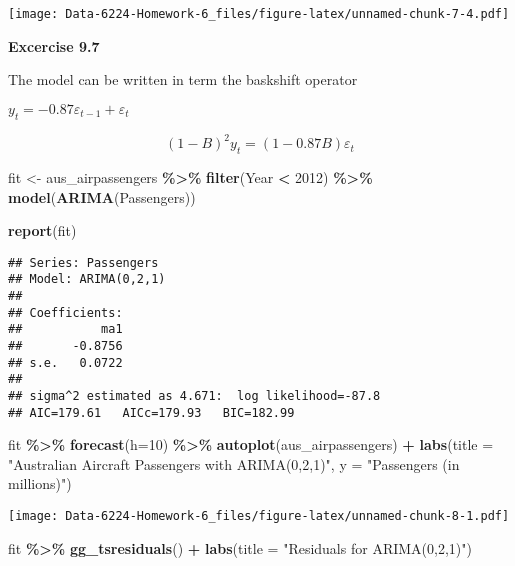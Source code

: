 \documentclass[
]{article}
\newenvironment{Shaded}{\begin{snugshade}}{\end{snugshade}}
\newcommand{\AttributeTok}[1]{\textcolor[rgb]{0.13,0.29,0.53}{#1}}
\newcommand{\DecValTok}[1]{\textcolor[rgb]{0.00,0.00,0.81}{#1}}
\newcommand{\FunctionTok}[1]{\textcolor[rgb]{0.13,0.29,0.53}{\textbf{#1}}}
\newcommand{\NormalTok}[1]{#1}
\newcommand{\OtherTok}[1]{\textcolor[rgb]{0.56,0.35,0.01}{#1}}
\newcommand{\SpecialCharTok}[1]{\textcolor[rgb]{0.81,0.36,0.00}{\textbf{#1}}}
\newcommand{\StringTok}[1]{\textcolor[rgb]{0.31,0.60,0.02}{#1}}
\begin{document}
\texttt{[image: Data-6224-Homework-6\_files/figure-latex/unnamed-chunk-7-4.pdf]}

\textbf{Excercise 9.7}

The model can be written in term the baskshift operator

\(y_t = -0.87 \varepsilon_{t-1} + \varepsilon_t\)

\[
(1 - B)^2 y_t = (1 - 0.87B) \varepsilon_t
\]

\begin{Shaded}
\begin{Highlighting}[]
\NormalTok{fit }\OtherTok{\textless{}{-}}\NormalTok{ aus\_airpassengers }\SpecialCharTok{\%\textgreater{}\%}
  \FunctionTok{filter}\NormalTok{(Year }\SpecialCharTok{\textless{}} \DecValTok{2012}\NormalTok{) }\SpecialCharTok{\%\textgreater{}\%}
  \FunctionTok{model}\NormalTok{(}\FunctionTok{ARIMA}\NormalTok{(Passengers)) }

\FunctionTok{report}\NormalTok{(fit)}
\end{Highlighting}
\end{Shaded}

\begin{verbatim}
## Series: Passengers 
## Model: ARIMA(0,2,1) 
## 
## Coefficients:
##           ma1
##       -0.8756
## s.e.   0.0722
## 
## sigma^2 estimated as 4.671:  log likelihood=-87.8
## AIC=179.61   AICc=179.93   BIC=182.99
\end{verbatim}

\begin{Shaded}
\begin{Highlighting}[]
\NormalTok{fit }\SpecialCharTok{\%\textgreater{}\%} 
  \FunctionTok{forecast}\NormalTok{(}\AttributeTok{h=}\DecValTok{10}\NormalTok{) }\SpecialCharTok{\%\textgreater{}\%}
  \FunctionTok{autoplot}\NormalTok{(aus\_airpassengers) }\SpecialCharTok{+}
  \FunctionTok{labs}\NormalTok{(}\AttributeTok{title =} \StringTok{"Australian Aircraft Passengers with ARIMA(0,2,1)"}\NormalTok{, }\AttributeTok{y =} \StringTok{"Passengers (in millions)"}\NormalTok{)}
\end{Highlighting}
\end{Shaded}

\texttt{[image: Data-6224-Homework-6\_files/figure-latex/unnamed-chunk-8-1.pdf]}

\begin{Shaded}
\begin{Highlighting}[]
\NormalTok{fit }\SpecialCharTok{\%\textgreater{}\%} 
  \FunctionTok{gg\_tsresiduals}\NormalTok{() }\SpecialCharTok{+}
  \FunctionTok{labs}\NormalTok{(}\AttributeTok{title =} \StringTok{"Residuals for ARIMA(0,2,1)"}\NormalTok{)}
\end{Highlighting}
\end{Shaded}
\end{document}

